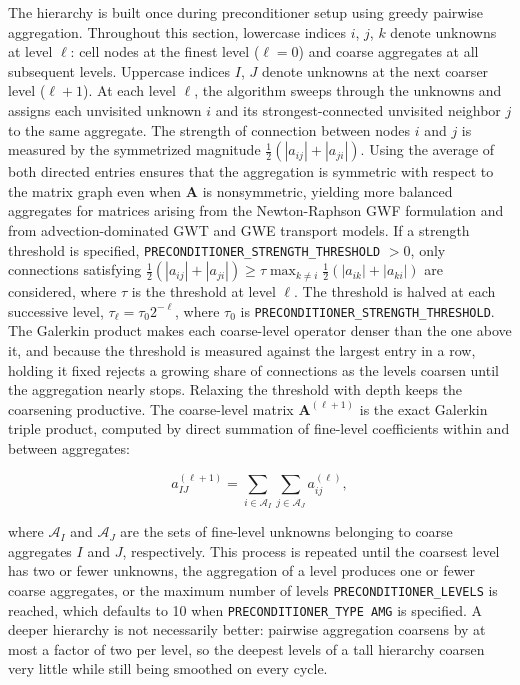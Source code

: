 The hierarchy is built once during preconditioner setup using greedy pairwise aggregation. Throughout this section, lowercase indices $i$, $j$, $k$ denote unknowns at level $\ell$: cell nodes at the finest level ($\ell = 0$) and coarse aggregates at all subsequent levels. Uppercase indices $I$, $J$ denote unknowns at the next coarser level ($\ell + 1$). At each level $\ell$, the algorithm sweeps through the unknowns and assigns each unvisited unknown $i$ and its strongest-connected unvisited neighbor $j$ to the same aggregate. The strength of connection between nodes $i$ and $j$ is measured by the symmetrized magnitude $\frac{1}{2}(|a_{ij}| + |a_{ji}|)$. Using the average of both directed entries ensures that the aggregation is symmetric with respect to the matrix graph even when $\mathbf{A}$ is nonsymmetric, yielding more balanced aggregates for matrices arising from the Newton-Raphson GWF formulation and from advection-dominated GWT and GWE transport models. If a strength threshold is specified, \texttt{PRECONDITIONER\_STRENGTH\_THRESHOLD} $> 0$, only connections satisfying $\frac{1}{2}(|a_{ij}| + |a_{ji}|) \ge \tau \max_{k \ne i}\frac{1}{2}(|a_{ik}| + |a_{ki}|)$ are considered, where $\tau$ is the threshold at level $\ell$. The threshold is halved at each successive level, $\tau_\ell = \tau_0 2^{-\ell}$, where $\tau_0$ is \texttt{PRECONDITIONER\_STRENGTH\_THRESHOLD}. The Galerkin product makes each coarse-level operator denser than the one above it, and because the threshold is measured against the largest entry in a row, holding it fixed rejects a growing share of connections as the levels coarsen until the aggregation nearly stops. Relaxing the threshold with depth keeps the coarsening productive. The coarse-level matrix $\mathbf{A}^{(\ell+1)}$ is the exact Galerkin triple product, computed by direct summation of fine-level coefficients within and between aggregates:

\begin{equation}
  \label{eqn:amgcoarse}
  a^{(\ell+1)}_{IJ} = \sum_{i \in \mathcal{A}_I} \sum_{j \in \mathcal{A}_J} a^{(\ell)}_{ij} ,
\end{equation}

\noindent where $\mathcal{A}_I$ and $\mathcal{A}_J$ are the sets of fine-level unknowns belonging to coarse aggregates $I$ and $J$, respectively. This process is repeated until the coarsest level has two or fewer unknowns, the aggregation of a level produces one or fewer coarse aggregates, or the maximum number of levels \texttt{PRECONDITIONER\_LEVELS} is reached, which defaults to 10 when \texttt{PRECONDITIONER\_TYPE AMG} is specified. A deeper hierarchy is not necessarily better: pairwise aggregation coarsens by at most a factor of two per level, so the deepest levels of a tall hierarchy coarsen very little while still being smoothed on every cycle.

